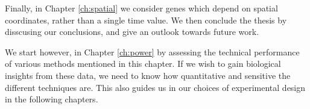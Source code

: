 Finally, in Chapter \ref{ch:spatial} we consider genes which depend on spatial coordinates, rather than a single time value. We then conclude the thesis by disscusing our conclusions, and give an outlook towards future work.

We start however, in Chapter \ref{ch:power} by assessing the technical performance of various methods mentioned in this chapter. If we wish to gain biological insights from these data, we need to know how quantitative and sensitive the different techniques are. This also guides us in our choices of experimental design in the following chapters.
